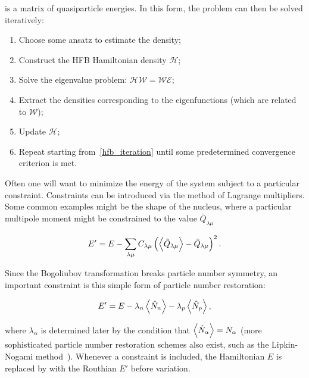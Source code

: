 \noindent is a matrix of quasiparticle energies. In this form, the problem can then be solved iteratively:
\begin{enumerate}
	\setlength\itemsep{-2em}
	\item Choose some ansatz to estimate the density;\\
	\item Construct the HFB Hamiltonian density $\mathcal{H}$;\\
	\item Solve the eigenvalue problem: $\mathcal{H}\mathcal{W} = \mathcal{W}\mathcal{E}$; \label{hfb_iteration}\\
	\item Extract the densities corresponding to the eigenfunctions (which are related to $\mathcal{W}$);\\
	\item Update $\mathcal{H}$; \\
	\item Repeat starting from~\ref{hfb_iteration} until some predetermined convergence criterion is met.
\end{enumerate}


Often one will want to minimize the energy of the system subject to a particular constraint. Constraints can be introduced via the method of Lagrange multipliers. Some common examples might be the shape of the nucleus, where a particular multipole moment might be constrained to the value $\bar{Q}_{\lambda\mu}$

\begin{equation}\label{eq:routhian}
E' = E - \sum_{\lambda\mu} C_{\lambda\mu} \left(\expval{\hat{Q}_{\lambda\mu}} - \bar{Q}_{\lambda\mu}\right)^2.
\end{equation}

\noindent Since the Bogoliubov transformation breaks particle number symmetry, an important constraint is this simple form of particle number restoration:

\begin{equation}
E' = E - \lambda_n \expval{\hat{N}_n} - \lambda_p \expval{\hat{N}_p},
\end{equation}

\noindent where $\lambda_\alpha$ is determined later by the condition that $\expval{\hat{N}_\alpha} = N_\alpha$ (more sophisticated particle number restoration schemes also exist, such as the Lipkin-Nogami method~\cite{Lipkin1960, Nogami1964, Pradhan1973, Flocard1997}). Whenever a constraint is included, the Hamiltonian $E$ is replaced by with the Routhian $E'$ before variation. %

